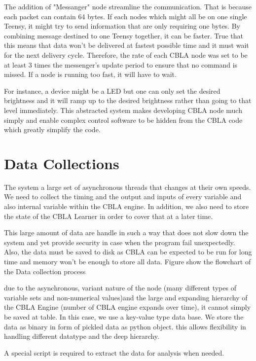 
The addition of  "Messanger" node streamline the communication. That is because each packet can contain 64 bytes. If each nodes which might all be on one single Teensy, it might try to send information that are only requiring one bytes. By combining message destined to one Teensy together, it can be faster. True that this means that data won't be delivered at fastest possible time and it must wait for the next delivery cycle. Therefore, the rate of each CBLA node was set to be at least 3 times the messenger's update period to ensure that no command is missed. 
If a node is running too fast, it will have to wait. 

For instance, a device might be a LED but one can only set the desired brightness and it will ramp up to the desired brightness rather than going to that level immediately. This abstracted system makes developing CBLA node much simply and enable complex control software to be hidden from the CBLA code which greatly simplify the code. 

\FloatBarrier
\section{Data Collections}

The system a large set of asynchronous threads that changes at their own speeds. We need to collect the timing and the output and inputs of every variable and also internal variable within the CBLA engine. In addition, we also need to store the state of the CBLA Learner in order to cover that at a later time. 

This large amount of data are handle in such a way that does not slow down the system and yet provide security in case when the program fail unexpectedly. Also, the data must be saved to disk as CBLA can be expected to be run for long time and memory won't be enough to store all data. 
Figure show the flowchart of the Data collection process

due to the asynchronous, variant nature of the node (many different types of variable sets and non-numerical values)and the large and expanding hierarchy of the CBLA Engine (number of CBLA engine expands over time), it cannot simply be saved at table. In this case, we use a key-value type data base. We store the data as binary in form of pickled data as python object. this allows flexibility in handling different datatype and the deep hierarchy. 

A special script is required to extract the data for analysis when needed. 

